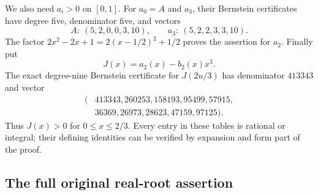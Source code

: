 \documentclass[11pt,a4paper]{article}
\theoremstyle{definition}\newtheorem{definition}[theorem]{Definition}
\theoremstyle{remark}\newtheorem{remark}[theorem]{Remark}
\begin{document}
We also need $a_i>0$ on $[0,1]$. For $a_0=A$ and $a_3$, their
Bernstein certificates have degree five, denominator five, and vectors
\[
 A:\ (5,2,0,0,3,10),\qquad
 a_3:\ (5,2,2,3,3,10).
\]
The factor $2x^2-2x+1=2(x-1/2)^2+1/2$ proves the assertion for $a_2$.
Finally put
\[
 J(x)=a_2(x)-b_2(x)x^3.
\tag{S4}\label{eq:stern-S4}
\]
The exact degree-nine Bernstein certificate for $J(2u/3)$ has
denominator $413343$ and vector
\[
\begin{split}
(&413343,260253,158193,95499,57915,\\
 &36369,26973,28623,47159,97125).
\end{split}
\]
Thus $J(x)>0$ for $0\leq x\leq2/3$. Every entry in these tables is
rational or integral; their defining identities can be verified by
expansion and form part of the proof.

\subsection{The full original real-root assertion}
\end{document}
